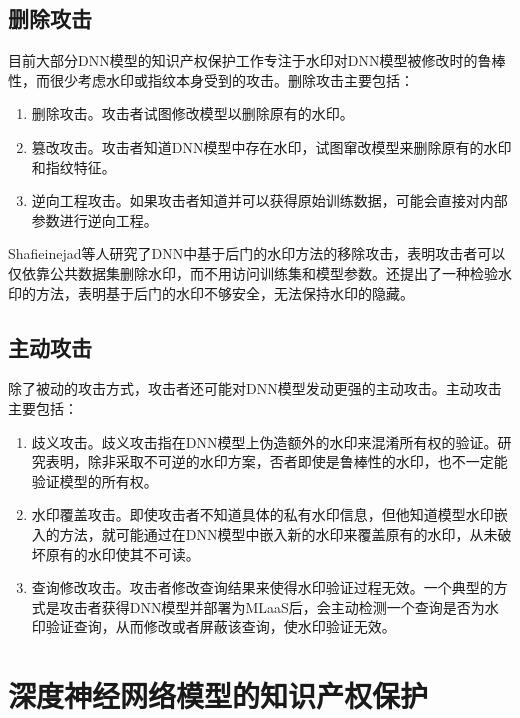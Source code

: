 \subsection{删除攻击}

目前大部分DNN模型的知识产权保护工作专注于水印对DNN模型被修改时的鲁棒性，而很少考虑水印或指纹本身受到的攻击。删除攻击主要包括：

\begin{enumerate}
	\renewcommand{\labelenumi}{\theenumi)}
	\item 删除攻击\cite{shafieinejad2021robustness}。攻击者试图修改模型以删除原有的水印。
	\item 篡改攻击。攻击者知道DNN模型中存在水印，试图窜改模型来删除原有的水印和指纹特征。
	\item 逆向工程攻击\cite{fan2019rethinking}。如果攻击者知道并可以获得原始训练数据，可能会直接对内部参数进行逆向工程。
\end{enumerate}

Shafieinejad等人\cite{shafieinejad2021robustness}研究了DNN中基于后门的水印方法的移除攻击，表明攻击者可以仅依靠公共数据集删除水印，而不用访问训练集和模型参数。还提出了一种检验水印的方法，表明基于后门的水印不够安全，无法保持水印的隐藏。


\subsection{主动攻击}

除了被动的攻击方式，攻击者还可能对DNN模型发动更强的主动攻击。主动攻击主要包括：

\begin{enumerate}
	\renewcommand{\labelenumi}{\theenumi)}
	\item 歧义攻击。歧义攻击指在DNN模型上伪造额外的水印来混淆所有权的验证。研究表明，除非采取不可逆的水印方案，否者即使是鲁棒性的水印，也不一定能验证模型的所有权\cite{fan2019rethinking}。
	\item 水印覆盖攻击\cite{darvish2019deepsigns, chen2019blackmarks, chen2019deepmarks}。即使攻击者不知道具体的私有水印信息，但他知道模型水印嵌入的方法，就可能通过在DNN模型中嵌入新的水印来覆盖原有的水印，从未破坏原有的水印使其不可读。
	\item 查询修改攻击。攻击者修改查询结果来使得水印验证过程无效。一个典型的方式是攻击者获得DNN模型并部署为MLaaS后，会主动检测一个查询是否为水印验证查询，从而修改或者屏蔽该查询，使水印验证无效。
\end{enumerate}


\section{深度神经网络模型的知识产权保护}

